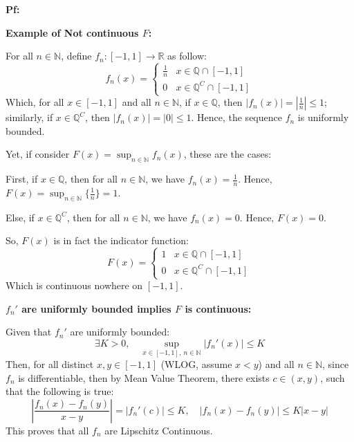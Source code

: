\documentclass{article}
\begin{document}
\textbf{Pf:}

\textbf{Example of Not continuous $F$:}

For all $n\in\mathbb{N}$, define $f_n:[-1,1]\rightarrow\mathbb{R}$ as follow:
$$f_n(x)=\begin{cases}
    \frac{1}{n} & x\in \mathbb{Q}\cap [-1,1]\\
    0 & x\in \mathbb{Q}^C\cap [-1,1]
\end{cases}$$
Which, for all $x\in [-1,1]$ and all $n\in\mathbb{N}$, if $x\in\mathbb{Q}$, then $|f_n(x)| = |\frac{1}{n}| \leq 1$; 
similarly, if $x\in\mathbb{Q}^C$, then $|f_n(x)|=|0|\leq 1$. Hence, the sequence $f_n$ is uniformly bounded.

\hfill

Yet, if consider $F(x)=\sup_{n\in\mathbb{N}}f_n(x)$, these are the cases:

First, if $x\in\mathbb{Q}$, then for all $n\in\mathbb{N}$, we have $f_n(x)=\frac{1}{n}$. Hence, $F(x)=\sup_{n\in\mathbb{N}}\{\frac{1}{n}\} = 1$.

Else, if $x\in \mathbb{Q}^C$, then for all $n\in\mathbb{N}$, we have $f_n(x)=0$. Hence, $F(x)=0$.

So, $F(x)$ is in fact the indicator function:
$$F(x)=\begin{cases}
    1 & x\in \mathbb{Q}\cap [-1,1]\\
    0 & x\in \mathbb{Q}^C\cap [-1,1]
\end{cases}$$
Which is continuous nowhere on $[-1,1]$.

\hfill

\hfill

\textbf{$f_n'$ are uniformly bounded implies $F$ is continuous:}

Given that $f_n'$ are uniformly bounded:
$$\exists K>0,\quad \sup_{x\in[-1,1],\ n\in\mathbb{N}}|f_n'(x)|\leq K$$
Then, for all distinct $x,y\in [-1,1]$ (WLOG, assume $x<y$) and all $n\in\mathbb{N}$, since $f_n$ is differentiable,
then by Mean Value Theorem, there exists $c\in (x,y)$, such that the following is true:
$$\left|\frac{f_n(x)-f_n(y)}{x-y}\right|=|f_n'(c)| \leq K,\quad |f_n(x)-f_n(y)|\leq K|x-y|$$
This proves that all $f_n$ are Lipschitz Continuous.

\hfill
\end{document}
